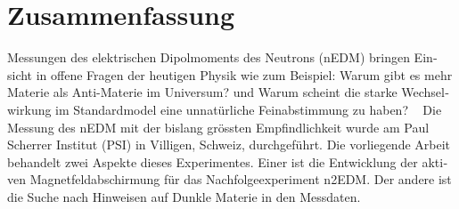 

\begingroup
\let\clearpage\relax
\let\cleardoublepage\relax
\let\cleardoublepage\relax

\chapter*{Zusammenfassung} %

\begin{otherlanguage}{ngerman}

Messungen des elektrischen Dipolmoments des Neutrons (nEDM) bringen Einsicht in offene Fragen der heutigen Physik wie zum Beispiel: \glqq{}Warum gibt es mehr Materie als Anti-Materie im Universum?\grqq{} und \glqq{}Warum scheint die starke Wechselwirkung im Standardmodel eine unnatürliche Feinabstimmung zu haben?\grqq{} \  %
Die Messung des nEDM mit der bislang grössten Empfindlichkeit wurde am Paul Scherrer Institut (PSI) in Villigen, Schweiz, durchgeführt.
Die vorliegende Arbeit behandelt zwei Aspekte dieses Experimentes. Einer ist die Entwicklung der aktiven Magnetfeldabschirmung  für das Nachfolgeexperiment n2EDM\@.
Der andere ist die Suche nach Hinweisen auf Dunkle Materie in den Messdaten.


\end{otherlanguage}
